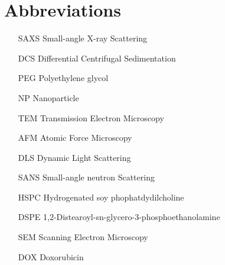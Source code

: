 \section*{Abbreviations}

\thispagestyle{empty}

\begin{itemize}
        \item   [SAXS] Small-angle X-ray Scattering
        \item   [DCS] Differential Centrifugal Sedimentation
        \item   [PEG] Polyethylene glycol
        \item   [NP] Nanoparticle
        \item   [TEM] Transmission Electron Microscopy
        \item   [AFM] Atomic Force Microscopy
        \item   [DLS] Dynamic Light Scattering
        \item   [SANS] Small-angle neutron Scattering
        \item   [HSPC] Hydrogenated soy phophatdydilcholine
        \item   [DSPE] 1,2-Distearoyl-sn-glycero-3-phosphoethanolamine
        \item   [SEM] Scanning Electron Microscopy
        \item   [DOX] Doxorubicin        
        

\end{itemize}
